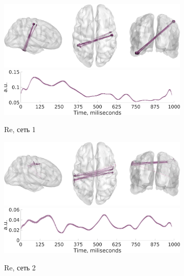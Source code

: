 \begin{figure}
\centering
{}

 \begin{subfigure}[b]{0.4\textwidth}
 \includegraphics[width=\textwidth]{../images/psiicos_paper/Figure12_a1.jpg}
 \includegraphics[width=\textwidth]{../images/psiicos_paper/Figure12_a2.jpg}
 \caption{Re, сеть 1}\label{fig:12a}
 \end{subfigure}
 \hspace{1cm}
 \begin{subfigure}[b]{0.4\textwidth}
 \includegraphics[width=\textwidth]{../images/psiicos_paper/Figure12_b1.jpg}
 \includegraphics[width=\textwidth]{../images/psiicos_paper/Figure12_b2.jpg}
 \caption{Re, сеть 2}\label{fig:12b}
 \end{subfigure}
 \begin{subfigure}[b]{0.4\textwidth}

\end{subfigure}
\end{figure}
